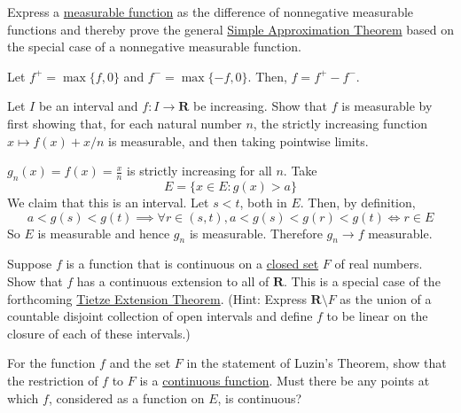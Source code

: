   \begin{exercise}[Royden 3.23]
    Express a \hyperref[def:measurable-function]{measurable function} as the difference of nonnegative measurable functions and thereby prove the general \hyperref[thm:simple-approximation-theorem]{Simple Approximation Theorem} based on the special case of a nonnegative measurable function.
  \end{exercise}
  \begin{solution}
    Let $f^+ = \max\{f, 0\}$ and $f^- = \max\{-f, 0\}$. Then, $f = f^+ - f^-$. 
  \end{solution}

  \begin{exercise}[Royden 3.24]
    Let $I$ be an interval and $f : I \to \mathbf{R}$ be increasing. Show that $f$ is measurable by first showing that, for each natural number $n$, the strictly increasing function $x \mapsto f(x) + x/n$ is measurable, and then taking pointwise limits.
  \end{exercise}
  \begin{solution}
    $g_n (x) = f(x) = \frac{x}{n}$ is strictly increasing for all $n$. Take 
    \begin{equation}
      E = \{x \in E \colon g(x) > a\} 
    \end{equation}
    We claim that this is an interval. Let $s < t$, both in $E$. Then, by definition, 
    \begin{equation}
      a < g(s) < g(t) \implies \forall r \in (s, t), a < g(s) < g(r) < g(t) \iff r \in E
    \end{equation}
    So $E$ is measurable and hence $g_n$ is measurable. Therefore $g_n \to f$ measurable. 
  \end{solution}

  \begin{exercise}[Royden 3.25]
    Suppose $f$ is a function that is continuous on a \hyperref[pst-def:closed]{closed set} $F$ of real numbers. Show that $f$ has a continuous extension to all of $\mathbf{R}$. This is a special case of the forthcoming \hyperref[pst-thm:tietze-extension-theorem]{Tietze Extension Theorem}. (Hint: Express $\mathbf{R} \setminus F$ as the union of a countable disjoint collection of open intervals and define $f$ to be linear on the closure of each of these intervals.)
  \end{exercise}

  \begin{exercise}[Royden 3.26]
    For the function $f$ and the set $F$ in the statement of Luzin's Theorem, show that the restriction of $f$ to $F$ is a \hyperref[pst-def:continuous_func]{continuous function}. Must there be any points at which $f$, considered as a function on $E$, is continuous?
  \end{exercise}

